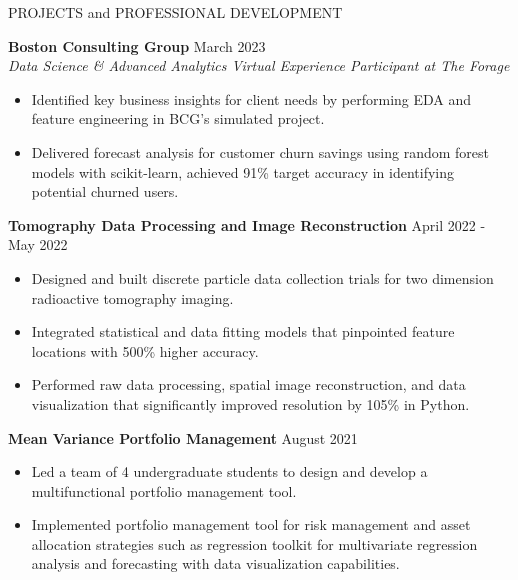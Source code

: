 \documentclass{resume} %
\begin{document}
\vspace{-0.5em}
\begin{rSection}{PROJECTS and PROFESSIONAL DEVELOPMENT}
\vspace{-1.25em}

\item \textbf{Boston Consulting Group} \hfill March 2023 \\
   \textit{Data Science \& Advanced Analytics Virtual Experience Participant at The Forage}
    \begin{itemize}
      \vspace{-0.6em}
      \itemsep -5.8pt {}
       \item Identified key business insights for client needs by performing EDA and feature engineering in BCG's simulated project.
       \item Delivered forecast analysis for customer churn savings using random forest models with scikit-learn, achieved 91\% target accuracy in identifying potential churned users.

    \end{itemize}

\item \textbf{Tomography Data Processing and Image Reconstruction} \hfill April 2022 - May 2022
\begin{itemize}
   \vspace{-0.4em}
   \itemsep -5.8pt {}
   \item Designed and built discrete particle data collection trials for two dimension radioactive tomography imaging.
   \item Integrated statistical and data fitting models that pinpointed feature locations with 500\% higher accuracy.
   \item Performed raw data processing, spatial image reconstruction, and data visualization that significantly improved resolution by 105\% in Python.
   
\end{itemize}

\item \textbf{Mean Variance Portfolio Management} \hfill August 2021
\begin{itemize}
   \vspace{-0.4em}
   \itemsep -5.8pt {}
   \item Led a team of 4 undergraduate students to design and develop a multifunctional portfolio management tool.
   \item Implemented portfolio management tool for risk management and asset allocation strategies such as regression toolkit for multivariate regression analysis and forecasting with data visualization capabilities.
   
\end{itemize}


\end{rSection} 
\end{document}
